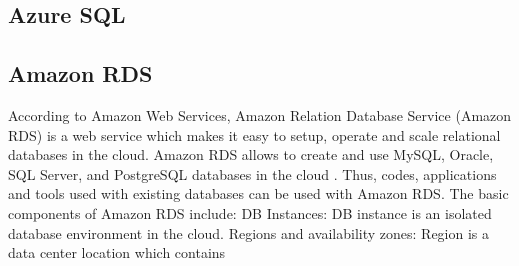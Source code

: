      \pv
      
\subsection{Azure SQL}

\pv 

\subsection{Amazon RDS }

     According to Amazon Web Services, Amazon Relation Database
     Service (Amazon RDS) is a web service which makes it easy to
     setup, operate and scale relational databases in the cloud. Amazon RDS
     allows to create and use
     MySQL, Oracle, SQL Server, and PostgreSQL databases in the
     cloud \cite{www-AmazonRDS}. Thus, codes, applications and tools used with existing
     databases can be used with Amazon RDS. The basic components of
     Amazon RDS include:
     DB Instances: DB instance is an isolated database environment in
     the cloud. Regions and availability zones: Region is a data
     center location which contains
